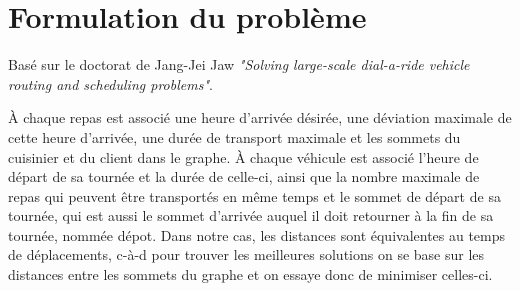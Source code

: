 \documentclass[10pt,a4paper]{report}
\begin{document}

\section*{Formulation du problème}
Basé sur le doctorat de Jang-Jei Jaw \textit{"Solving large-scale dial-a-ride vehicle routing and scheduling problems"}. \newline

À chaque repas est associé une heure d'arrivée désirée, une déviation maximale de cette heure d'arrivée, une durée de transport maximale et les sommets du cuisinier et du client dans le graphe. À chaque véhicule est associé l'heure de départ de sa tournée et la durée de celle-ci, ainsi que la nombre maximale de repas qui peuvent être transportés en même temps et le sommet de départ de sa tournée, qui est aussi le sommet d'arrivée auquel il doit retourner à la fin de sa tournée, nommée dépot. Dans notre cas, les distances sont équivalentes au temps de déplacements, c-à-d pour trouver les meilleures solutions on se base sur les distances entre les sommets du graphe et on essaye donc de minimiser celles-ci.

    
\end{document}
